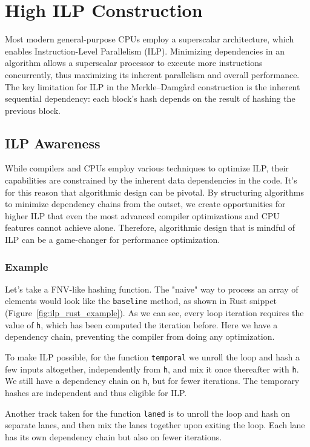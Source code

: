 \documentclass[10pt]{article}
\begin{document}
\clearpage
\section{High ILP Construction} \label{highilp}

Most modern general-purpose CPUs employ a superscalar architecture, which enables Instruction-Level Parallelism (ILP). 
Minimizing dependencies in an algorithm allows a superscalar processor to execute more instructions concurrently, thus maximizing its inherent parallelism and overall performance.
The key limitation for ILP in the Merkle–Damgård construction is the inherent sequential dependency: each block's hash depends on the result of hashing the previous block.

\subsection{ILP Awareness}

While compilers and CPUs employ various techniques to optimize ILP, their capabilities are constrained by the inherent data dependencies in the code. It's for this reason that algorithmic design can be pivotal. By structuring algorithms to minimize dependency chains from the outset, we create opportunities for higher ILP that even the most advanced compiler optimizations and CPU features cannot achieve alone. Therefore, algorithmic design that is mindful of ILP can be a game-changer for performance optimization.

\subsubsection{Example}
Let's take a FNV-like hashing function. The "naive" way to process an array of elements would look like the \texttt{baseline} method, as shown in Rust snippet (Figure~\ref{fig:ilp_rust_example}). As we can see, every loop iteration requires the value of \texttt{h}, which has been computed the iteration before. Here we have a dependency chain, preventing the compiler from doing any optimization.

To make ILP possible, for the function \texttt{temporal} we unroll the loop and hash a few inputs altogether, independently from \texttt{h}, and mix it once thereafter with \texttt{h}. We still have a dependency chain on \texttt{h}, but for fewer iterations.
The temporary hashes are independent and thus eligible for ILP.

Another track taken for the function \texttt{laned} is to unroll the loop and hash on separate lanes, and then mix the lanes together upon exiting the loop. Each lane has its own dependency chain but also on fewer iterations.
\end{document}
